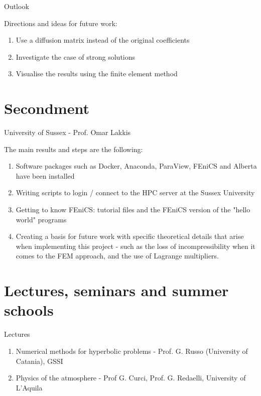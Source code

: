 \documentclass{beamer}
\begin{document}
\begin{frame}{Outlook}

Directions and ideas for future work:
  \begin{enumerate}
    \item Use a diffusion matrix instead of the original coefficients
    \item Investigate the case of strong solutions
    \item Visualise the results using the finite element method
  \end{enumerate}
\end{frame}

\section{Secondment}

\begin{frame}{University of Sussex - Prof. Omar Lakkis}

The main results and steps are the following:

\begin{enumerate}

  \item Software packages such as Docker, Anaconda, ParaView, FEniCS and Alberta have been installed
  \item Writing scripts to login / connect to the HPC server at the Sussex University
  \item Getting to know FEniCS: tutorial files and the FEniCS version of the "hello world" programs
  \item Creating a basis for future work with specific theoretical details that arise when implementing this project - such as the loss of incompressibility when it comes to the FEM approach, and the use of Lagrange multipliers.

\end{enumerate}
  
\end{frame}

\section{Lectures, seminars and summer schools}

\begin{frame}{Lectures}

  \begin{enumerate}
    \item Numerical methods for hyperbolic problems - Prof. G. Russo (University of Catania), GSSI
    \item Physics of the atmosphere - Prof G. Curci, Prof. G. Redaelli, University of L'Aquila
  \end{enumerate}
  
\end{frame}
\end{document}
